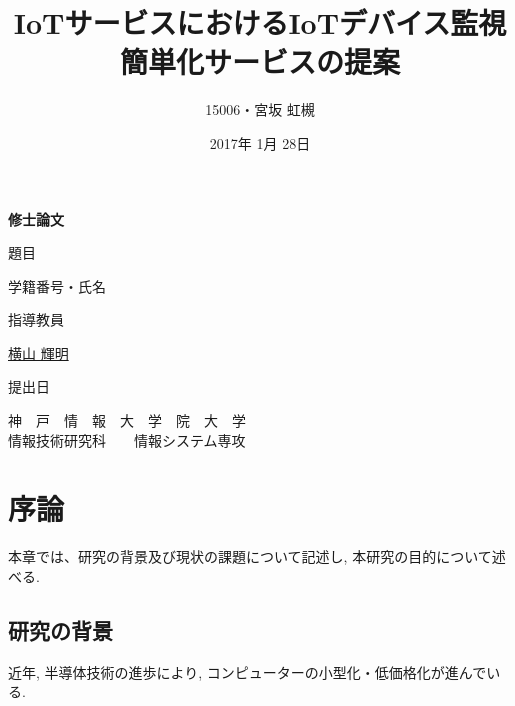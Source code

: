 \documentclass[a4paper]{jreport}
\begin{document}
\makeatletter

\title{IoTサービスにおけるIoTデバイス監視簡単化サービスの提案}
\author{15006・宮坂 虹槻}
\date{2017年 1月 28日}
\def\@teacher{横山 輝明}


\begin{titlepage}\begin{center}
\thispagestyle{plain}
{\Huge \textbf{修士論文} \par}
\vspace{1.5cm}
{\LARGE\gt 題目 \par}
{\LARGE\gt \underline{\@title} \par}
\vspace{2.5cm}
{\LARGE\gt 学籍番号・氏名 \par}
\vspace{1.5cm}
{\LARGE \underline{\@author} \par}
\vspace{1.5cm}
{\LARGE\gt 指導教員 \par}
\vspace{1.5cm}
{\LARGE\gt \underline{\@teacher} \par}
\vspace{1.5cm}
{\LARGE\gt 提出日 \par}
\vspace{1.5cm}
{\LARGE\gt \underline{\@date} \par}
\vspace{1.5cm}
{\Large\gt
神　戸　情　報　大　学　院　大　学\\
情報技術研究科　　情報システム専攻\\
\par}
\end{center}\end{titlepage}
\restoregeometry
\makeatother

\tableofcontents

\begin{abstract}

\end{abstract}

\chapter{序論}
本章では、研究の背景及び現状の課題について記述し, 本研究の目的について述べる.
\section{研究の背景}
近年, 半導体技術の進歩により, コンピューターの小型化・低価格化が進んでいる. 
\end{document}
